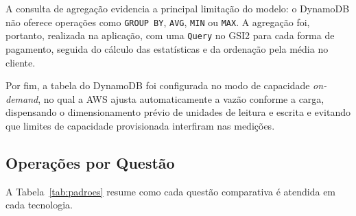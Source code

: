 \documentclass[12pt]{article}
\begin{document}
 
A consulta de agregação evidencia a principal limitação do modelo: o
DynamoDB não oferece operações como \texttt{GROUP BY}, \texttt{AVG},
\texttt{MIN} ou \texttt{MAX}. A agregação foi, portanto, realizada na
aplicação, com uma \texttt{Query} no GSI2 para cada forma de pagamento,
seguida do cálculo das estatísticas e da ordenação pela média no cliente.
 
 
Por fim, a tabela do DynamoDB foi configurada no modo de capacidade
\textit{on-demand}, no qual a AWS ajusta automaticamente a vazão conforme a
carga, dispensando o dimensionamento prévio de unidades de leitura e
escrita e evitando que limites de capacidade provisionada interfiram nas
medições.

\subsection{Operações por Questão}

A Tabela~\ref{tab:padroes} resume como cada questão comparativa é atendida em
cada tecnologia.
\end{document}
